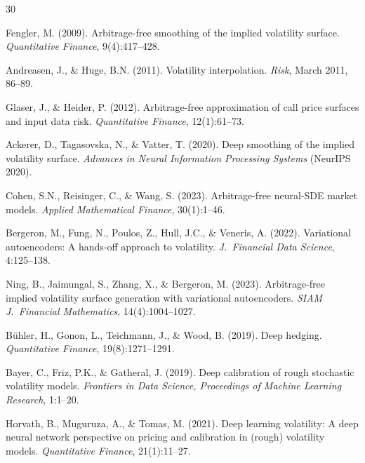 \documentclass[11pt,a4paper]{article}
\begin{document}
\begin{thebibliography}{30}

Fengler, M. (2009).
Arbitrage-free smoothing of the implied volatility surface.
\emph{Quantitative Finance}, 9(4):417--428.

Andreasen, J., \& Huge, B.N. (2011).
Volatility interpolation.
\emph{Risk}, March 2011, 86--89.

Glaser, J., \& Heider, P. (2012).
Arbitrage-free approximation of call price surfaces and input data risk.
\emph{Quantitative Finance}, 12(1):61--73.


Ackerer, D., Tagasovska, N., \& Vatter, T. (2020).
Deep smoothing of the implied volatility surface.
\emph{Advances in Neural Information Processing Systems} (NeurIPS 2020).

Cohen, S.N., Reisinger, C., \& Wang, S. (2023).
Arbitrage-free neural-SDE market models.
\emph{Applied Mathematical Finance}, 30(1):1--46.

Bergeron, M., Fung, N., Poulos, Z., Hull, J.C., \& Veneris, A. (2022).
Variational autoencoders: A hands-off approach to volatility.
\emph{J.\ Financial Data Science}, 4:125--138.

Ning, B., Jaimungal, S., Zhang, X., \& Bergeron, M. (2023).
Arbitrage-free implied volatility surface generation with variational autoencoders.
\emph{SIAM J.\ Financial Mathematics}, 14(4):1004--1027.

B\"uhler, H., Gonon, L., Teichmann, J., \& Wood, B. (2019).
Deep hedging.
\emph{Quantitative Finance}, 19(8):1271--1291.


Bayer, C., Friz, P.K., \& Gatheral, J. (2019).
Deep calibration of rough stochastic volatility models.
\emph{Frontiers in Data Science, Proceedings of Machine Learning Research}, 1:1--20.

Horvath, B., Muguruza, A., \& Tomas, M. (2021).
Deep learning volatility: A deep neural network perspective on pricing and calibration in (rough) volatility models.
\emph{Quantitative Finance}, 21(1):11--27.


\end{thebibliography}
\end{document}
